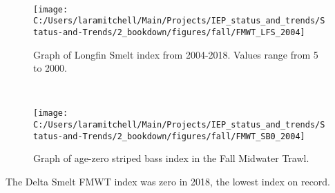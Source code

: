 \documentclass[
]{book}
\begin{document}
\begin{panel-grid}
\begin{columns-nocenter}
\begin{column800}
\end{column800}

\begin{column40}

~

\end{column40}

\begin{column800}

\begin{expand}

\begin{figure}
\texttt{[image: C:/Users/laramitchell/Main/Projects/IEP\_status\_and\_trends/Status-and-Trends/2\_bookdown/figures/fall/FMWT\_LFS\_2004]} \caption{Graph of Longfin Smelt index from 2004-2018. Values range from 5 to 2000.}\label{fig:unnamed-chunk-140}
\end{figure}

\end{expand}

\end{column800}

\begin{column40}

~

\end{column40}

\begin{column800}

\begin{expand}

\begin{figure}
\texttt{[image: C:/Users/laramitchell/Main/Projects/IEP\_status\_and\_trends/Status-and-Trends/2\_bookdown/figures/fall/FMWT\_SB0\_2004]} \caption{Graph of age-zero striped bass index in the Fall Midwater Trawl.}\label{fig:unnamed-chunk-141}
\end{figure}

\end{expand}

\end{column800}

\end{columns-nocenter}

\begin{columns-nocenter}

\begin{column800}

The Delta Smelt FMWT index was zero in 2018, the lowest index on record.

\end{column800}


\end{columns-nocenter}
\end{panel-grid}
\end{document}
